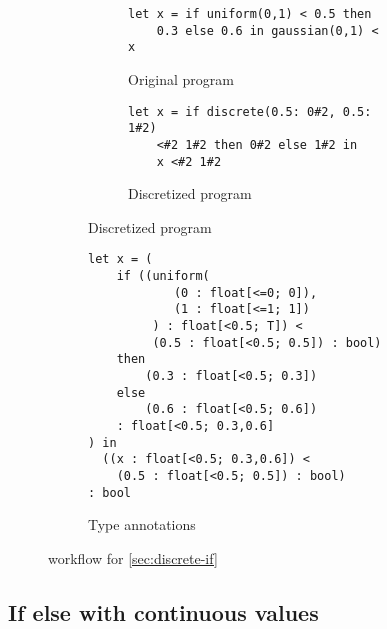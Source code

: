 \documentclass[acmsmall,screen,dvipsnames,x11names,nonacm,anonymous,review]{acmart}
\newcommand{\Slice}{\text{\scshape Slice}\xspace}
\begin{document}
\begin{figure}[ht]
\centering
\begin{subfigure}[t]{0.48\textwidth}  %
  \centering
  \begin{subfigure}[t]{\textwidth}
    \begin{lstlisting}
let x = if uniform(0,1) < 0.5 then 
    0.3 else 0.6 in gaussian(0,1) < x
    \end{lstlisting}
    \caption{Original program}
    \label{fig:subA}
  \end{subfigure}

  \vspace{2em} %

  \begin{subfigure}[t]{\textwidth}
    \begin{lstlisting}
let x = if discrete(0.5: 0#2, 0.5: 1#2) 
    <#2 1#2 then 0#2 else 1#2 in
    x <#2 1#2
    \end{lstlisting}
    \caption{Discretized program}
    \label{fig:subC}
  \end{subfigure}
\end{subfigure}
\hfill
\begin{subfigure}[t]{0.48\textwidth}
  \begin{lstlisting}
let x = (
    if ((uniform(
            (0 : float[<=0; 0]), 
            (1 : float[<=1; 1])
         ) : float[<0.5; T]) < 
         (0.5 : float[<0.5; 0.5]) : bool) 
    then
        (0.3 : float[<0.5; 0.3])
    else
        (0.6 : float[<0.5; 0.6])
    : float[<0.5; 0.3,0.6]
) in
  ((x : float[<0.5; 0.3,0.6]) < 
    (0.5 : float[<0.5; 0.5]) : bool) 
: bool
  \end{lstlisting}
  \caption{Type annotations}
  \label{fig:subB}
\end{subfigure}

\caption{\Slice workflow for \ref{sec:discrete-if}}
\label{fig:main}
\end{figure}


\subsection{If else with continuous values}
\label{sec:continuous-if}
\end{document}
